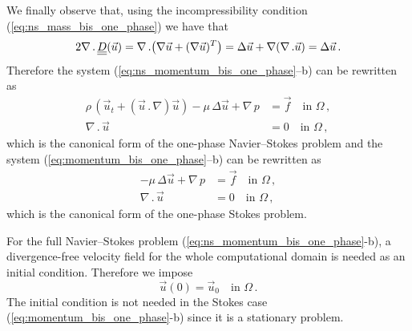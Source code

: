 We finally observe that, using the incompressibility condition
(\ref{eq:ns_mass_bis_one_phase}) we have that
\begin{equation}
2\nabla\,.\,\mat D(\vec u) = \nabla\,.\big(\nabla\vec u+(\nabla\vec u)^T\big)=
\Delta \vec u + \nabla(\nabla\,.\vec u) = \Delta \vec u\,.
\end{equation}
Therefore the system (\ref{eq:ns_momentum_bis_one_phase}--b) can be rewritten as
\begin{subequations}
\begin{alignat}{2}
\rho\,(\vec u_t +(\vec u \,.\, \nabla) \vec u) - \mu\,\Delta\vec u+\nabla\,p
& = \vec f \quad \mbox{in } \Omega\,, \\
\nabla\,.\,\vec u & = 0 \quad \mbox{in } \Omega\,,
\end{alignat}
\end{subequations}
which is the canonical form of the one-phase Navier--Stokes problem and the
system (\ref{eq:momentum_bis_one_phase}--b) can be rewritten as
\begin{subequations}
\begin{alignat}{2}
- \mu\,\Delta\vec u+\nabla\,p & = \vec f \quad \mbox{in } \Omega\,, \\
\nabla\,.\,\vec u & = 0 \quad \mbox{in } \Omega\,,
\end{alignat}
\end{subequations}
which is the canonical form of the one-phase Stokes problem.

For the full Navier--Stokes problem (\ref{eq:ns_momentum_bis_one_phase}-b), a
divergence-free velocity field for the whole computational domain is needed as
an initial condition. Therefore we impose
\begin{equation}\label{eq:ns_ic}
\vec u(0) = \vec u_0 \quad \mbox{in } \Omega\,.
\end{equation}
The initial condition is not needed in the Stokes case
(\ref{eq:momentum_bis_one_phase}-b) since it is a stationary problem.

